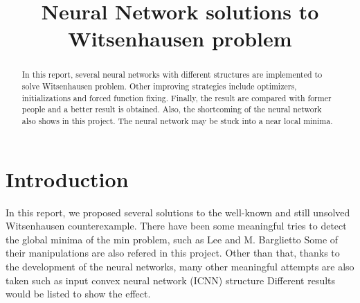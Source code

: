 \documentclass[conference,compsoc]{IEEEtran}
\begin{document}
%
\title{Neural Network solutions to Witsenhausen problem}


\author{
}


\maketitle

\begin{abstract}
 In this report, several neural networks with different structures are implemented to solve Witsenhausen problem. Other improving strategies include optimizers, initializations and forced function fixing. Finally, the result are compared with former people and a better result is obtained. Also, the shortcoming of the neural network also shows in this project. The neural network may be stuck into a near local minima.
\end{abstract}


\section{Introduction}
  In this report, we proposed several solutions to the well-known and still unsolved Witsenhausen counterexample. \cite{witsenhausen1968counterexample} There have been some meaningful tries to detect the global minima of the min problem, such as Lee \cite{lee2001witsenhausen}and M. Barglietto \cite{baglietto2001numerical} Some of their manipulations are also refered in this project. Other than that, thanks to the development of the neural networks, many other meaningful attempts are also taken such as input convex neural network (ICNN) structure \cite{amos2017input} Different results would be listed to show the effect.
\end{document}
